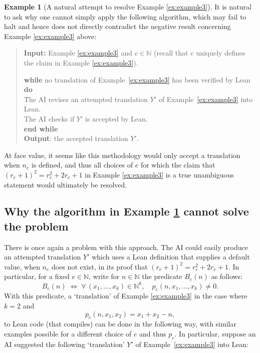 \documentclass[10pt, a4paper, reqno]{amsart}
\numberwithin{equation}{section}
\theoremstyle{definition}
\newtheorem{example}[theorem]{Example}
\theoremstyle{definition}
\begin{document}
 
 

\begin{example}[A natural attempt to resolve Example \ref{ex:example3}]\label{ex:example4} It is natural to ask why one cannot simply apply the following algorithm, which may fail to halt and hence does not directly contradict the negative result concerning Example \ref{ex:example3} above:
	\begin{quote}
		\textbf{Input:} Example \ref{ex:example3} and $e \in \mathbb{N}$ (recall that $e$ uniquely defines the claim in Example \ref{ex:example3}).
		\begin{tabbing}
			\textbf{while} no translation of Example~\ref{ex:example3} has been verified by Lean \textbf{do}\\
			\quad\= The AI revises an attempted translation $Y'$ of Example~\ref{ex:example3} into Lean.\\
			\> The AI checks if $Y'$ is accepted by Lean.\\
			\textbf{end while}\\
			\textbf{Output}: the accepted translation $Y'$.
		\end{tabbing}
	\end{quote}
At face value, it seems like this methodology would only accept a translation when $n_e$ is defined, and thus all choices of $e$ for which the claim that $(r_e+1)^2 = r_e^2 + 2r_e+1$ in Example \ref{ex:example3} is a true unambiguous statement would ultimately be resolved.
\end{example}	

	
\subsection{Why the algorithm in Example \ref{ex:example4} cannot solve the problem}\label{sec:why}	
	
	There is once again a problem with this approach. The AI could easily produce an attempted translation $Y'$ which uses a Lean definition that supplies a default value, when $n_e$ does not exist, in its proof that $(r_e+1)^2 = r_e^2 + 2r_e+1$. In particular, for a fixed $e \in \mathbb{N}$, write for $n \in \mathbb{N}$ the predicate $B_e(n)$ as follows:
	\begin{equation}\label{eq:pred}
	B_e(n)\;\Longleftrightarrow\;
	\forall \,(x_1, \ldots, x_k) \in\mathbb N^k,\quad p_e(n,x_1, \ldots, x_k)\ne0.
	\end{equation}
	With this predicate, a `translation' of Example \ref{ex:example3} in the case where $k=2$ and 
	\begin{equation}\label{eq:pol}
	p_e(n,x_1,x_2) = x_1 + x_2 - n,
	\end{equation}
	 to Lean code (that compiles) can be done in the following way, with similar examples possible for a different choice of $e$ and thus $p_e$. In particular, suppose an AI suggested the following `translation' $Y'$ of Example~\ref{ex:example3} into Lean:
	
\end{document}
